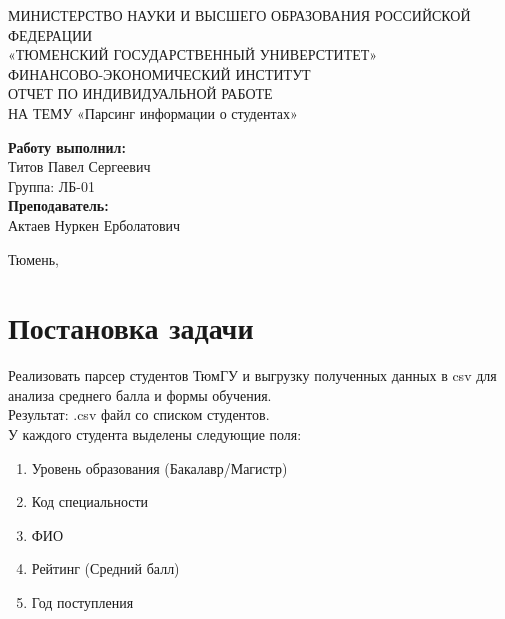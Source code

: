 \documentclass[a4paper,12pt]{article} %
\begin{document}
\begin{titlepage}

    \begin{center}
        \large МИНИСТЕРСТВО НАУКИ И ВЫСШЕГО ОБРАЗОВАНИЯ РОССИЙСКОЙ ФЕДЕРАЦИИ \\
        \large «ТЮМЕНСКИЙ ГОСУДАРСТВЕННЫЙ УНИВЕРСТИТЕТ» \\
        \large ФИНАНСОВО-ЭКОНОМИЧЕСКИЙ ИНСТИТУТ \\[6cm]
        
        \large ОТЧЕТ ПО ИНДИВИДУАЛЬНОЙ РАБОТЕ \\[0.5cm]
        \large НА ТЕМУ «Парсинг информации о студентах» \\[5.1cm]
    \end{center}

    \begin{flushright} %
        \begin{minipage}{0.40\textwidth} %
            \begin{flushleft} %

                \large \textbf{Работу выполнил:}\\
                \large Титов Павел Сергеевич \\
                \large {Группа:} ЛБ-01 \\

                \large \textbf{Преподаватель:}\\
                \large Актаев Нуркен Ерболатович

            \end{flushleft}
        \end{minipage}
    \end{flushright}

    \vfill

    \begin{center}
        \large Тюмень, \the\year
    \end{center}

\end{titlepage}

\tableofcontents
\newpage

\section*{Постановка задачи}
Реализовать парсер студентов ТюмГУ и выгрузку полученных данных в csv для анализа среднего балла и формы обучения.\\
Результат: .csv файл со списком студентов. \\
У каждого студента выделены следующие поля: 
\begin{enumerate}
    \item Уровень образования (Бакалавр/Магистр)
    \item Код специальности
    \item ФИО
    \item Рейтинг (Средний балл)
    \item Год поступления
\end{enumerate}
\newpage
\end{document}
